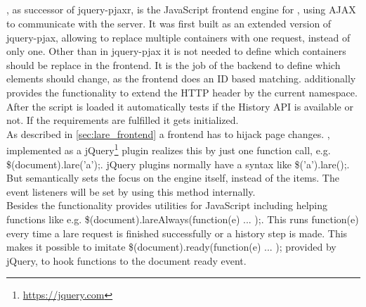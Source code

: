 \subsection{\lareJS{}}
\lareJS{}, as successor of jquery-pjaxr, is the JavaScript frontend engine for \lare{}, using AJAX to communicate with the server.
It was first built as an extended version of jquery-pjax, allowing to replace multiple containers with one request, instead of only one.
Other than in jquery-pjax it is not needed to define which containers should be replace in the frontend.
It is the job of the backend to define which elements should change, as the frontend does an ID based matching.
\lareJS{} additionally provides the functionality to extend the HTTP header by the current \lare{} namespace.
\\
After the script is loaded it automatically tests if the History API is available or not.
If the requirements are fulfilled it gets initialized.
\\
As described in \ref{sec:lare_frontend} a \lare{} frontend has to hijack page changes.
\lareJS{}, implemented as a jQuery\footnote{\url{https://jquery.com}} plugin realizes this by just one function call, e.g. \$(document).lare('a');.
jQuery plugins normally have a syntax like \$('a').lare();.
But semantically \lareJS{} sets the focus on the engine itself, instead of the items.
The event listeners will be set by using this method internally.
\\
Besides the \lare{} functionality \lareJS{} provides utilities for JavaScript including helping functions like e.g. \$(document).lareAlways(function(e) { ... });.
This runs function(e) {} every time a lare request is finished successfully or a history step is made.
This makes it possible to imitate \$(document).ready(function(e) { ... }); provided by jQuery, to hook functions to the document ready event.